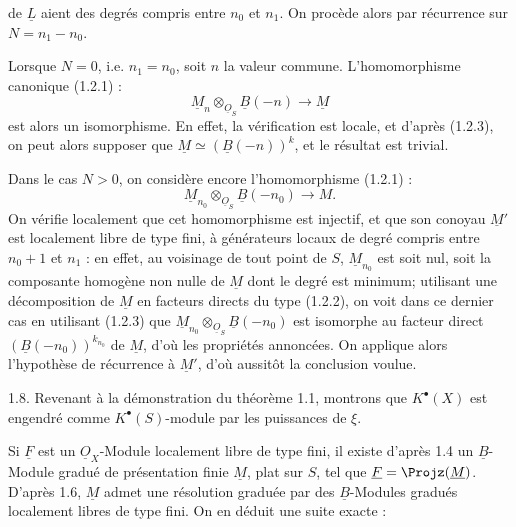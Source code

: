 
de \(\underline{L}\)
aient des degrés compris entre \(n_0\) et \(n_1\). On procède alors par récurrence sur \(N=n_1-n_0\).

Lorsque \(N=0\), i.e. \(n_1=n_0\), soit \(n\) la valeur commune. L'homomorphisme canonique (1.2.1) :
\[
  \underline{M}_n\otimes_{\underline{O}_S}\underline{B}(-n)\longrightarrow \underline{M}
\]
est alors un isomorphisme. En effet, la vérification est locale, et d'après (1.2.3), on peut alors supposer que \(\underline{M}\simeq(\underline{B}(-n))^k\), et le résultat est trivial.

Dans le cas \(N>0\), on considère encore l'homomorphisme (1.2.1) :
\[
  \underline{M}_{n_0}\otimes_{\underline{O}_S}\underline{B}(-n_0)\longrightarrow M.
\]
On vérifie localement que cet homomorphisme est injectif, et que son conoyau \(\underline{M}'\) est localement libre de type fini, à générateurs locaux de degré compris entre \(n_0+1\) et \(n_1\) : en effet, au voisinage de tout point de \(S\), \(\underline{M}_{n_0}\) est soit nul, soit la composante homogène non nulle de \(\underline{M}\) dont le degré est minimum; utilisant une décomposition de \(\underline{M}\) en facteurs directs du type (1.2.2), on voit dans ce dernier cas en utilisant (1.2.3) que \(\underline{M}_{n_0}\otimes_{\underline{O}_S}\underline{B}(-n_0)\) est isomorphe au facteur direct \((\underline{B}(-n_0))^{k_{n_0}}\) de \(\underline{M}\), d'où les propriétés annoncées. On applique alors l'hypothèse de récurrence à \(\underline{M}'\), d'où aussitôt la conclusion voulue.

1.8. Revenant à la démonstration du théorème 1.1, montrons que \(K^{\bullet}(X)\) est engendré comme \(K^{\bullet}(S)\)-module par les puissances de \(\xi\).

Si \(\underline{F}\) est un \(\underline{O}_X\)-Module localement libre de type fini, il existe d'après 1.4 un \(\underline{B}\)-Module gradué de présentation finie \(\underline{M}\), plat sur \(S\), tel que \(\underline{F}=\Projz(\underline{M})\). D'après 1.6, \(\underline{M}\) admet une résolution graduée par des \(\underline{B}\)-Modules gradués localement libres de type fini. On en déduit une
suite exacte :
